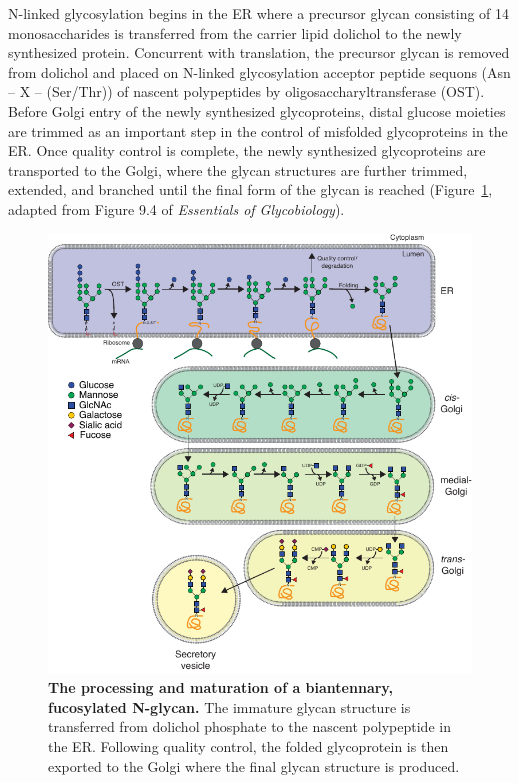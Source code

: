 N-linked glycosylation begins in the ER where a precursor glycan consisting of 14 monosaccharides is transferred from the carrier lipid dolichol to the newly synthesized protein. Concurrent with translation, the precursor glycan is removed from dolichol and placed on N-linked glycosylation acceptor peptide sequons (Asn – X – (Ser/Thr)) of nascent polypeptides by oligosaccharyltransferase (OST)\cite{kornfeld_assembly_1985,lizak_x-ray_2011,ruiz-canada_cotranslational_2009,kelleher_evolving_2006,schreiner_novel_1994,valliere-douglass_glutamine-linked_2010,zielinska_precision_2010}. Before Golgi entry of the newly synthesized glycoproteins, distal glucose moieties are trimmed as an important step in the control of misfolded glycoproteins in the ER\cite{moremen_vertebrate_2012,helenius_roles_2004,lederkremer_glycoprotein_2009}. Once quality control is complete, the newly synthesized glycoproteins are transported to the Golgi, where the glycan structures are further trimmed, extended, and branched until the final form of the glycan is reached (Figure~\ref{fig:ch1fig2}, adapted from Figure 9.4 of \emph{Essentials of Glycobiology}\cite{varki_essentials_2017}).

\begin{figure}
    \includegraphics[keepaspectratio=true,width=\textwidth,height=\textheight]{chapters/chapter1/chapter1_Figure2.pdf}
    \caption{\textbf{The processing and maturation of a biantennary, fucosylated N-glycan.} The immature glycan structure is transferred from dolichol phosphate to the nascent polypeptide in the ER. Following quality control, the folded glycoprotein is then exported to the Golgi where the final glycan structure is produced.}
    \label{fig:ch1fig2}
\end{figure}

